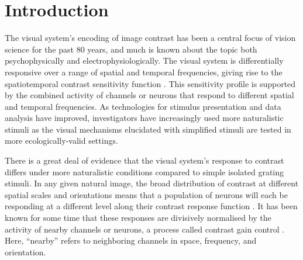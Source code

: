 \documentclass[11pt,a4paper]{article}
\begin{document}
\newpage

\section{Introduction}

The visual system's encoding of image contrast has been a central focus of vision science for the past 80 years, and much is known about the topic both psychophysically and electrophysiologically.
The visual system is differentially responsive over a range of spatial and temporal frequencies, giving rise to the spatiotemporal contrast sensitivity function \citep{Kelly1984,Watson2005}.
This sensitivity profile is supported by the combined activity of channels \citep{Campbell1968,Graham1971,Graham1978,Cannon1991,Watson1997,Meese2005,Haun2010} or neurons \citep{Blakemore1969,Lennie2005,Ringach1997,Goris2009,Goris2013,Kwon2008,HaRu98} that respond to different spatial and temporal frequencies.
As technologies for stimulus presentation and data analysis have improved, investigators have increasingly used more naturalistic stimuli \citep{Peli1990,Lee2001,Ringach2002,David2004,Mante2005,Geisler2008,
Geisler2009a,Geisler2009,Freeman2011a,Wang2012a,RuPa12,Wallis2012,Haun2013a,Alam2014} 
as the visual mechanisms elucidated with simplified stimuli are tested in more ecologically-valid settings.

There is a great deal of evidence that the visual system's response to contrast differs under more naturalistic conditions compared to simple isolated grating stimuli. 
In any given natural image, the broad distribution of contrast at different spatial scales \citep{Balboa2003,Frazor2006} and orientations means that a population of neurons will each be responding at a different level along their contrast response function \citep{Bex2007,Goris2009,Goris2013}.
It has been known for some time that these responses are divisively normalised by the activity of nearby channels or neurons, a process called contrast gain control \citep{Morrone1982,Heeger1992,Geisler1992,Foley1994}.
Here, ``nearby'' refers to neighboring channels in 
space, 
frequency,
and orientation. 
\end{document}
